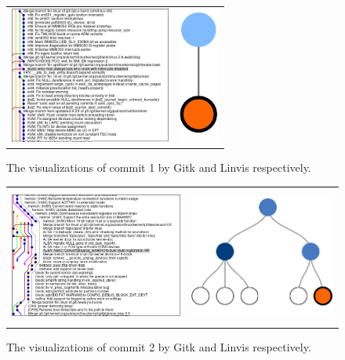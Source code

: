 \begin{figure}[htpb]
  \centering
  \begin{tabular}{cc}
    \includegraphics[height=4.5cm]{Figures/evaluation/commit1_gitk.png} &
    \includegraphics[height=4.5cm]{Figures/evaluation/commit1_linvis.pdf}
  \end{tabular}
  \caption{The visualizations of commit 1 by Gitk and Linvis
    respectively.}
  \label{fig:commit_1_visualization}
\end{figure}

\begin{figure}[htpb]
  \centering
  \begin{tabular}{cc}
    \includegraphics[height=4.5cm]{Figures/evaluation/commit2_gitk.png} &
    \includegraphics[height=4.5cm]{Figures/evaluation/commit2_linvis.pdf}
  \end{tabular}
  \caption{The visualizations of commit 2 by Gitk and Linvis
    respectively.}
  \label{fig:commit_2_visualization}
\end{figure}

